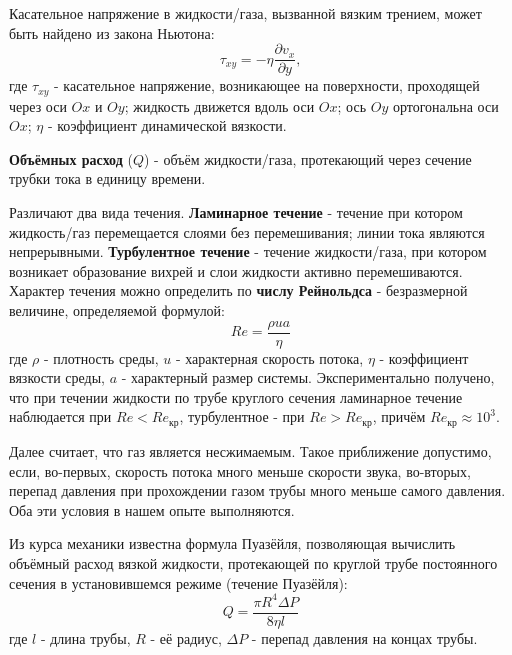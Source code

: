 \documentclass[15pt,a5paper,reqno]{article}
\begin{document}
    Касательное напряжение в жидкости/газа, вызванной вязким трением, может быть найдено из закона Ньютона:
    \begin{equation}
        \tau_{xy} = -\eta\frac{\partial v_x}{\partial y},
    \end{equation}
    где $\tau_{xy}$ - касательное напряжение, возникающее на поверхности, проходящей через оси $Ox$ и $Oy$; жидкость движется вдоль оси $Ox$; ось $Oy$ ортогональна оси $Ox$; $\eta$ - коэффициент динамической вязкости.
    
    \textbf{Объёмных расход} ($Q$) - объём жидкости/газа, протекающий через сечение трубки тока в единицу времени.
    
    Различают два вида течения. \textbf{Ламинарное течение} - течение при котором жидкость/газ перемещается слоями без перемешивания; линии тока являются непрерывными. \textbf{Турбулентное течение} - течение жидкости/газа, при котором возникает образование вихрей и слои жидкости активно перемешиваются. Характер течения можно определить по \textbf{числу Рейнольдса} - безразмерной величине, определяемой формулой:
    \begin{equation}
        \boxed{Re = \frac{\rho ua}{\eta}}
    \end{equation}
    где $\rho$ - плотность среды, $u$ - характерная скорость потока, $\eta$ - коэффициент вязкости среды, $a$ - характерный размер системы. Экспериментально получено, что при течении жидкости по трубе круглого сечения ламинарное течение наблюдается при $Re < Re_{\text{кр}}$, турбулентное - при $Re > Re_{\text{кр}}$, причём $Re_{\text{кр}}\approx 10^3$.
    
    Далее считает, что газ является несжимаемым. Такое приближение допустимо, если, во-первых, скорость потока много меньше скорости звука, во-вторых, перепад давления при прохождении газом трубы много меньше самого давления. Оба эти условия в нашем опыте выполняются.
    
    Из курса механики известна формула Пуазёйля, позволяющая вычислить объёмный расход вязкой жидкости, протекающей по круглой трубе постоянного сечения в установившемся режиме (течение Пуазёйля):
    \begin{equation}\label{puaz}
        \boxed{Q = \frac{\pi R^4\Delta P}{8\eta l}}
    \end{equation}
    где $l$ - длина трубы, $R$ - её радиус, $\Delta P$ - перепад давления на концах трубы.
    
\end{document}
